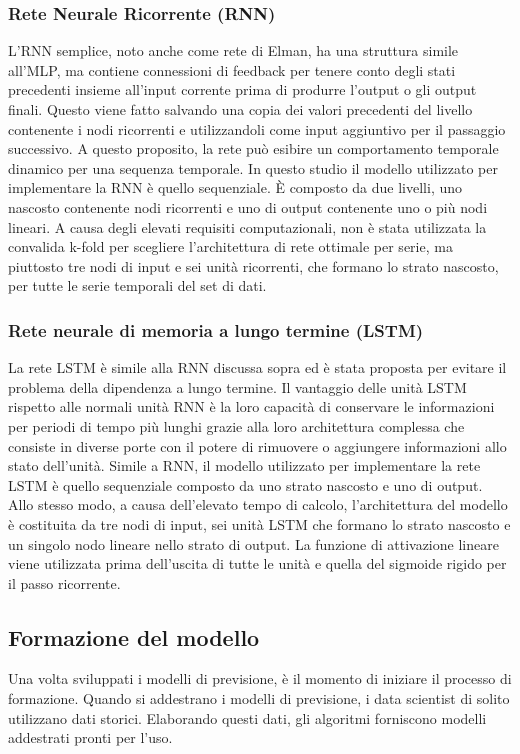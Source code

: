 \documentclass[12pt,a4paper]{report}
\begin{document}
\subsubsection{Rete Neurale Ricorrente (RNN)}
L'RNN semplice, noto anche come rete di Elman, ha una struttura simile all'MLP, ma contiene connessioni di feedback per tenere conto degli stati precedenti insieme all'input corrente prima di produrre l'output o gli output finali.
Questo viene fatto salvando una copia dei valori precedenti del livello contenente i nodi ricorrenti e utilizzandoli come input aggiuntivo per il passaggio successivo. A questo proposito, la rete può esibire un comportamento temporale dinamico per una sequenza temporale.
In questo studio il modello utilizzato per implementare la RNN è quello sequenziale. È composto da due livelli, uno nascosto contenente nodi ricorrenti e uno di output contenente uno o più nodi lineari. A causa degli elevati requisiti computazionali, non è stata utilizzata la convalida k-fold per scegliere l'architettura di rete ottimale per serie, ma piuttosto tre nodi di input e sei unità ricorrenti, che formano lo strato nascosto, per tutte le serie temporali del set di dati. 


\subsubsection{Rete neurale di memoria a lungo termine (LSTM)}
La rete LSTM è simile alla RNN discussa sopra ed è stata proposta per evitare il problema della dipendenza a lungo termine. Il vantaggio delle unità LSTM rispetto alle normali unità RNN è la loro capacità di conservare le informazioni per periodi di tempo più lunghi grazie alla loro architettura complessa che consiste in diverse porte con il potere di rimuovere o aggiungere informazioni allo stato dell'unità.
Simile a RNN, il modello utilizzato per implementare la rete LSTM è quello sequenziale composto da uno strato nascosto e uno di output. Allo stesso modo, a causa dell'elevato tempo di calcolo, l'architettura del modello è costituita da tre nodi di input, sei unità LSTM che formano lo strato nascosto e un singolo nodo lineare nello strato di output. La funzione di attivazione lineare viene utilizzata prima dell'uscita di tutte le unità e quella del sigmoide rigido per il passo ricorrente. 

\subsection{Formazione del modello}
Una volta sviluppati i modelli di previsione, è il momento di iniziare il processo di formazione. Quando si addestrano i modelli di previsione, i data scientist di solito utilizzano dati storici. Elaborando questi dati, gli algoritmi forniscono modelli addestrati pronti per l'uso.
\end{document}
